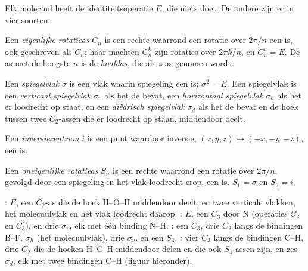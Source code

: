 Elk molecuul heeft de identiteitsoperatie $E$, die niets doet. De andere
zijn er in vier soorten.

\begin{definition}\label{def:b3:point-groups:rotation}
Een \emph{eigenlijke rotatieas} $C_n$ is een
rechte waarrond een rotatie over $2\pi/n$ een  is, ook
geschreven als
$C_n$; haar machten $C_n^k$ zijn rotaties over $2\pi k/n$, en $C_n^n = E$. De
as met de hoogste $n$ is de \emph{hoofdas}, die als $z$-as
genomen wordt.
\end{definition}

\begin{definition}[Spiegelvlakken]\label{def:b3:point-groups:mirror}
Een \emph{spiegelvlak} $\sigma$ is een vlak waarin
spiegeling een  is; $\sigma^2 = E$. Een spiegelvlak is een
\emph{verticaal spiegelvlak} $\sigma_v$ als het
de  bevat, een \emph{horizontaal
spiegelvlak} $\sigma_h$ als het er loodrecht
op staat, en een
\emph{diëdrisch spiegelvlak}
$\sigma_d$ als het de  bevat en de hoek tussen twee
$C_2$-assen die er loodrecht op staan, middendoor deelt.
\end{definition}

\begin{definition}[Inversiecentrum]\label{def:b3:point-groups:inversion}
Een \emph{inversiecentrum} $i$ is een punt
waardoor inversie, $(x, y, z) \mapsto (-x, -y, -z)$, een
 is.
\end{definition}

\begin{definition}\label{def:b3:point-groups:improper}
Een \emph{oneigenlijke rotatieas} $S_n$ is een
rechte waarrond een rotatie over $2\pi/n$, gevolgd door een spiegeling in
het vlak loodrecht erop, een  is. $S_1 = \sigma$ en $S_2 = i$.
\end{definition}

\begin{example}\label{ex:b3:point-groups:elements}
: $E$, een $C_2$-as die de hoek H--O--H middendoor deelt, en twee
verticale vlakken, het molecuulvlak en het vlak loodrecht daarop. :
$E$, een $C_3$ door N (operaties $C_3$ en $C_3^2$), en drie $\sigma_v$, elk
met één binding N--H. : een $C_3$, drie $C_2$ langs de bindingen
B--F, $\sigma_h$ (het molecuulvlak), drie $\sigma_v$, en een $S_3$. :
vier $C_3$ langs de bindingen C--H, drie $C_2$ die de hoeken H--C--H
middendoor delen en die ook $S_4$-assen zijn, en zes $\sigma_d$, elk met
twee bindingen C--H (figuur hieronder).
\end{example}

